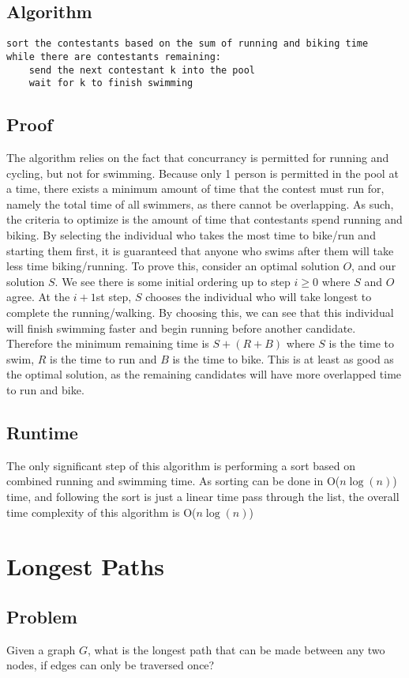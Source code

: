 \documentclass[titlepage]{article}
\numberwithin{equation}{subsection}
\begin{document}
\subsection{Algorithm}
\begin{lstlisting}
sort the contestants based on the sum of running and biking time
while there are contestants remaining:
    send the next contestant k into the pool
    wait for k to finish swimming
\end{lstlisting}
\subsection{Proof}
The algorithm relies on the fact that concurrancy is permitted for
running and cycling, but not for swimming. Because only 1 person is
permitted in the pool at a time, there exists a minimum amount of
time that the contest must run for, namely the total time of all
swimmers, as there cannot be overlapping. As such, the criteria to
optimize is the amount of time that contestants spend running and
biking. By selecting the individual who takes the most time to bike/run
and starting them first, it is guaranteed that anyone who swims after them
will take less time biking/running. To prove this, consider an optimal solution $O$,
and our solution $S$. We see there is some initial ordering up to step $i \geq 0$
where $S$ and $O$ agree. At the $i+1$st step, $S$ chooses the individual who
will take longest to complete the running/walking. By choosing this, we can
see that this individual will finish swimming faster and begin running before
another candidate. Therefore the minimum remaining time is $S+(R+B)$ where 
$S$ is the time to swim, $R$ is the time to run and $B$ is the time to bike.
This is at least as good as the optimal solution, as the remaining candidates will
have more overlapped time to run and bike.
\subsection{Runtime}
The only significant step of this algorithm is performing a sort based on
combined running and swimming time. As sorting can be done in O($n\log(n)$) time,
and following the sort is just a linear time pass through the list, the
overall time complexity of this algorithm is O($n\log(n)$)
\section{Longest Paths}
\subsection{Problem}
Given a graph $G$, what is the longest path that can be made between
any two nodes, if edges can only be traversed once?
\end{document}
